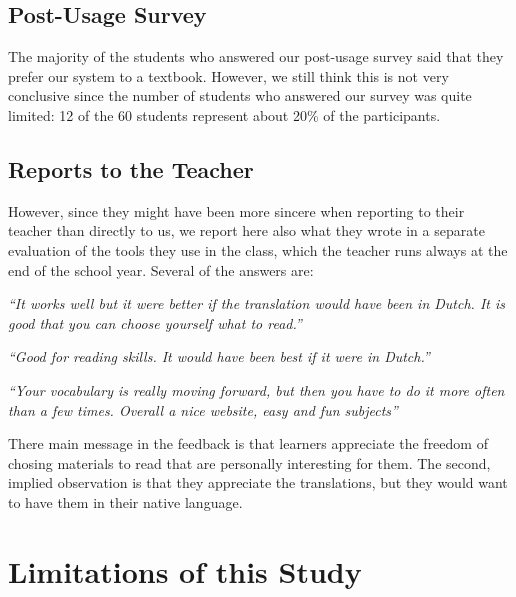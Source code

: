 \subsection{Post-Usage Survey}

The majority of the students who answered our post-usage survey said that  they prefer our system to a textbook. However, we still think this is not very conclusive since the number of students who answered our survey was quite limited: 12 of the 60 students represent about 20\% of the participants. 


\subsection{Reports to the Teacher}
However, since they might have been more sincere when reporting to their teacher than directly to us, we report here also what they wrote in a separate evaluation of the tools they use in the class, which the teacher runs always at the end of the school year. Several of the answers are: 

\begin{description}
  \item {\em ``It works well but it were better if the translation would have been in Dutch. It is good that you can choose yourself what to read.''}
  \item {\em ``Good for reading skills. It would have been best if it were in Dutch.''}
  \item {\em ``Your vocabulary is really moving forward, but then you have to do it more often than a few times. Overall a nice website, easy and fun subjects''}
\end{description}

There main message in the feedback is that learners appreciate the freedom of chosing materials to read that are personally interesting for them. The second, implied observation is that they appreciate the translations, but they would want to have them in their native language. 



\newpage
\section{Limitations of this Study}
\label{sec:limitations}

